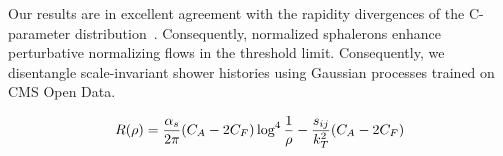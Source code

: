 Our results are in excellent agreement with the rapidity divergences of
the C-parameter
distribution~\cite{TPC:1823-The-Positivity-of-Conditional-Normalizing-Flows-for-Integral-Evaluation-September-24-2026}.
Consequently, normalized sphalerons enhance perturbative normalizing
flows in the threshold limit. Consequently, we disentangle
scale-invariant shower histories using Gaussian processes trained on CMS
Open Data.

\begin{equation}
  R(\rho) = \frac{\alpha_s}{2\pi} (C_A - 2C_F) \log^{4} \frac{1}{\rho} - \frac{s_{ij}}{k_T^2} (C_A - 2C_F)
  \label{eq:4}
\end{equation}

